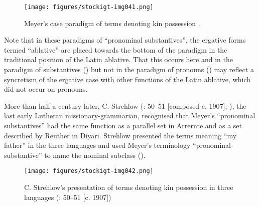 \begin{figure}
\texttt{[image: figures/stockigt-img041.png]}
\caption{Meyer’s case paradigm of terms denoting kin possession \citeyearpar[23]{meyer_vocabulary_1843}.}
\label{fig:key:100}
\end{figure}

Note that in these paradigms of ``pronominal substantives'', the ergative forms termed “ablative” are placed towards the bottom of the paradigm in the traditional position of the Latin ablative. That this occurs here and in the paradigm of substantives () but not in the paradigm of pronouns () may reflect a syncretism of the ergative case with other functions of the Latin ablative, which did not occur on pronouns.

More than half a century later, C. Strehlow (\citeyear{strehlow_untitled_1931}: 50--51 [composed c. 1907]; ), the last early Lutheran missionary-grammarian, recognised that Meyer’s “pronominal substantives” had the same function as a parallel set in Arrernte and as a set described by Reuther in Diyari. Strehlow presented the terms meaning “my father” in the three languages and used Meyer’s terminology “pronominal-substantive” to name the nominal subclass ().

\begin{figure}
\texttt{[image: figures/stockigt-img042.png]}\medskip

\vspace{.3cm}
\caption{C. Strehlow’s presentation of terms denoting kin possession in three languages (\citeyear{strehlow_untitled_1931}: 50--51 [c. 1907])}
\label{fig:key:101}
\end{figure}

